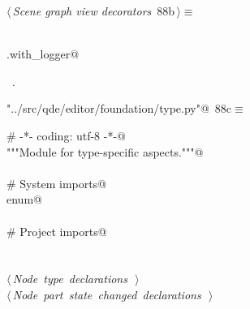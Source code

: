 \documentclass[
    a4paper,      %
    10pt,         %
    openright,    %
    notitlepage,  %
    parskip=half, %
]{scrreprt}       %
\theoremstyle{definition}                    %
\begin{document}
\begin{flushleft} \small
\begin{minipage}{\linewidth}\label{scrap144}\raggedright\small
{} $\langle\,${\itshape Scene graph view decorators}\nobreak\ {\footnotesize {88b}}$\,\rangle\equiv$
\vspace{-1exm}
\begin{list}{}{} \item
\mbox{}\lstinline@@\\
\mbox{}\lstinline@common.with_logger@\\
\mbox{}\lstinline@@{\NWsep}
\end{list}
\vspace{-1.5ex}
\footnotesize
\begin{list}{}{\setlength{\itemsep}{-\parsep}\setlength{\itemindent}{-\leftmargin}}
\item \NWtxtMacroRefIn\ .

\item{}
\end{list}
\end{minipage}\vspace{4ex}
\end{flushleft}
\begin{flushleft} \small
\begin{minipage}{\linewidth}\label{scrap145}\raggedright\small
{} \verb@"../src/qde/editor/foundation/type.py"@\nobreak\ {\footnotesize {88c}}$\equiv$
\vspace{-1ex}
\begin{list}{}{} \item
\mbox{}\lstinline@# -*- coding: utf-8 -*-@\\
\mbox{}\lstinline@"""Module for type-specific aspects."""@\\
\mbox{}\lstinline@@\\
\mbox{}\lstinline@# System imports@\\
\mbox{}\lstinline@import enum@\\
\mbox{}\lstinline@@\\
\mbox{}\lstinline@# Project imports@\\
\mbox{}\lstinline@@\\
\mbox{}\lstinline@@\\
\mbox{}\lstinline@@\hbox{$\langle\,${\itshape Node type declarations}\nobreak\ {\footnotesize {}}$\,\rangle$}\lstinline@@\\
\mbox{}\lstinline@@\hbox{$\langle\,${\itshape Node part state changed declarations}\nobreak\ {\footnotesize {}}$\,\rangle$}\lstinline@@\\
\mbox{}\lstinline@@{\NWsep}
\end{list}
\vspace{-1.5ex}
\footnotesize
\begin{list}{}{\setlength{\itemsep}{-\parsep}\setlength{\itemindent}{-\leftmargin}}

\item{}
\end{list}
\end{minipage}\vspace{4ex}
\end{flushleft}
\end{document}
